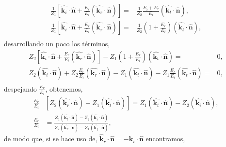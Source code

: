\documentclass[11pt,fleqn]{book} %
\begin{document}
\begin{equation*}
\begin{split}
\frac{1}{Z_1}\left[\hat{\textbf{k}_i}\cdot\hat{\textbf{n}}+\frac{E_r}{E_i}(\hat{\textbf{k}_r}\cdot\hat{\textbf{n}})\right]=&\frac{1}{Z_2}\frac{E_i+E_r}{E_i}(\hat{\textbf{k}_t}\cdot\hat{\textbf{n}}),\\
\frac{1}{Z_1}\left[\hat{\textbf{k}_i}\cdot\hat{\textbf{n}}+\frac{E_r}{E_i}(\hat{\textbf{k}_r}\cdot\hat{\textbf{n}})\right]=&\frac{1}{Z_2}\left(1+\frac{E_r}{E_i}\right)(\hat{\textbf{k}_t}\cdot\hat{\textbf{n}}),\\
\end{split}
\end{equation*}
desarrollando un poco los t\'erminos,
\begin{equation*}
\begin{split}
Z_2\left[\hat{\textbf{k}_i}\cdot\hat{\textbf{n}}+\frac{E_r}{E_i}(\hat{\textbf{k}_r}\cdot\hat{\textbf{n}})\right]-Z_1\left(1+\frac{E_r}{E_i}\right)(\hat{\textbf{k}_t}\cdot\hat{\textbf{n}})=&0,\\
Z_2(\hat{\textbf{k}_i}\cdot\hat{\textbf{n}})+Z_2\frac{E_r}{E_i}(\hat{\textbf{k}_r}\cdot\hat{\textbf{n}})-Z_1(\hat{\textbf{k}_t}\cdot\hat{\textbf{n}})-Z_1\frac{E_r}{E_i}(\hat{\textbf{k}_t}\cdot\hat{\textbf{n}})=&0,\\
\end{split}
\end{equation*}
despejando $\frac{E_r}{E_i}$, obtenemos,
\begin{equation*}
\begin{split}
\frac{E_r}{E_i}&\left[ Z_2(\hat{\textbf{k}_r}\cdot\hat{\textbf{n}})-Z_1(\hat{\textbf{k}_t}\cdot\hat{\textbf{n}})\right]=Z_1(\hat{\textbf{k}_t}\cdot\hat{\textbf{n}})-Z_2(\hat{\textbf{k}_i}\cdot\hat{\textbf{n}}),\\
\frac{E_r}{E_i}&=\frac{Z_1(\hat{\textbf{k}_t}\cdot\hat{\textbf{n}})-Z_2(\hat{\textbf{k}_i}\cdot\hat{\textbf{n}})}{Z_2(\hat{\textbf{k}_r}\cdot\hat{\textbf{n}})-Z_1(\hat{\textbf{k}_t}\cdot\hat{\textbf{n}})},
\end{split}
\end{equation*}
de modo que, si se hace uso de, $\hat{\textbf{k}}_r\cdot\hat{\textbf{n}}=-\hat{\textbf{k}}_i\cdot\hat{\textbf{n}}$ encontramos,
\end{document}
